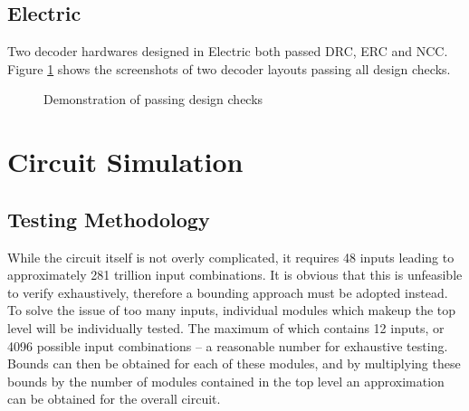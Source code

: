 \documentclass[conference]{IEEEtran}
\begin{document}
\subsection{Electric}
Two decoder hardwares designed in Electric both passed DRC, ERC and NCC. Figure \ref{fig:electric} shows the screenshots of two decoder layouts passing all design checks.
\begin{figure}[h]
\centerline{
\hfil
{}}
\caption{Demonstration of passing design checks}
\label{fig:electric}
\end{figure}
\section{Circuit Simulation}
\subsection{Testing Methodology}
While the circuit itself is not overly complicated, it requires 48 inputs leading to approximately 281 trillion input combinations. It is obvious that this is unfeasible to verify exhaustively, therefore a bounding approach must be adopted instead. To solve the issue of too many inputs, individual modules which makeup the top level will be individually tested. The maximum of which contains 12 inputs, or 4096 possible input combinations – a reasonable number for exhaustive testing. Bounds can then be obtained for each of these modules, and by multiplying these bounds by the number of modules contained in the top level an approximation can be obtained for the overall circuit.
\end{document}
